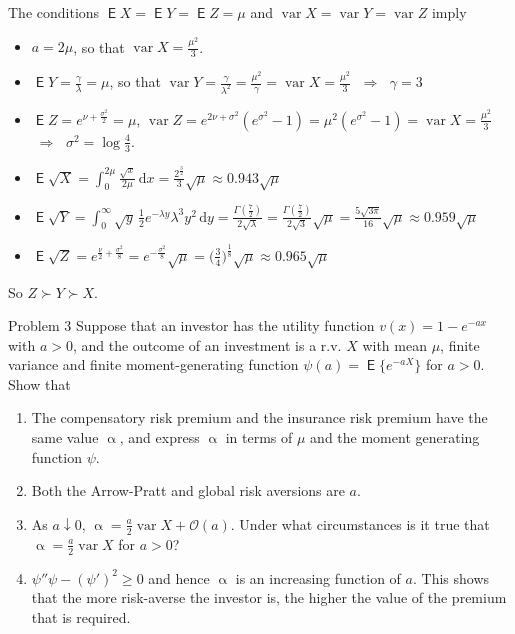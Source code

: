 \documentclass[10pt]{beamer}
\newcommand{\ds}{\displaystyle}
\newcommand{\ie}{\;\Longrightarrow\;}
\DeclareMathOperator\expc{\mathsf{E}}
\DeclareMathOperator\var{var}
\theoremstyle{definition}
\begin{document}
\begin{frame}[allowframebreaks]
  The conditions $\expc X = \expc Y = \expc Z = \mu$ and $\var X = \var Y = \var Z$ imply 
  \begin{itemize}
    \item $a = 2\mu$, so that $\ds\var X = \frac{\mu^2}{3}$.
    \item $\ds\expc Y = \frac{\gamma}{\lambda} = \mu$, so that $\ds\var Y = \frac{\gamma}{\lambda^2} = \frac{\mu^2}{\gamma} = \var X = \frac{\mu^2}{3}$ $\ie$ $\gamma = 3$ 
    \item $\ds\expc Z = e^{\nu + \frac{\sigma^2}{2}} = \mu$, $\ds\var Z = e^{2\nu + \sigma^2}(e^{\sigma^2} - 1) = \mu^2(e^{\sigma^2} - 1) = \var X = \frac{\mu^2}{3}$ $\ie$ $\ds\sigma^2 = \log\frac{4}{3}$. 
  \end{itemize}
  \begin{itemize}
    \item $\ds\expc\sqrt{X} = \int_0^{2\mu}\frac{\sqrt{x}}{2\mu}\,\text{d}x = \frac{2^{\frac{3}{2}}}{3}\sqrt{\mu}\approx 0.943\sqrt{\mu}$
    \item $\ds\expc\sqrt{Y} = \int_0^\infty\sqrt{y}\,\frac{1}{2}e^{-\lambda y}\lambda^3 y^2\,\text{d}y = \frac{\Gamma(\frac{7}{2})}{2\sqrt{\lambda}} = \frac{\Gamma(\frac{7}{2})}{2\sqrt{3}}\sqrt{\mu} = \frac{5\sqrt{3\pi}}{16}\sqrt{\mu}\approx 0.959\sqrt{\mu}$
    \item $\ds\expc\sqrt{Z} = e^{\frac{\nu}{2} + \frac{\sigma^2}{8}} = e^{-\frac{\sigma^2}{8}}\sqrt{\mu} = \Big(\frac{3}{4}\Big)^{\frac{1}{8}}\sqrt{\mu}\approx 0.965\sqrt{\mu}$
  \end{itemize}
  So $Z\succ Y\succ X$.
\end{frame}

\begin{frame}{Problem 3}
  Suppose that an investor has the utility function $v(x) = 1 - e^{-a x}$ with $a > 0$, and the outcome of an investment is a r.v. $X$ with mean $\mu$, finite variance and finite moment-generating function $\psi(a) = \expc\big\{e^{-aX}\big\}$ for $a > 0$. Show that 
  \begin{enumerate}
    \item The compensatory risk premium and the insurance risk premium have the same value $\upalpha$, and express $\upalpha$ in terms of $\mu$ and the moment generating function $\psi$.
    \item Both the Arrow-Pratt and global risk aversions are $a$.
    \item As $a\downarrow 0$, $\ds\upalpha = \frac{a}{2}\var{X} + \mathcal{O}(a)$. Under what circumstances is it true that $\ds\upalpha = \frac{a}{2}\var{X}$ for $a > 0$?
    \item $\psi''\psi - (\psi')^2\geqslant 0$ and hence $\upalpha$ is an increasing function of $a$. This shows that the more risk-averse the investor is, the higher the value of the premium that is required.
  \end{enumerate}
\end{frame}
\end{document}
